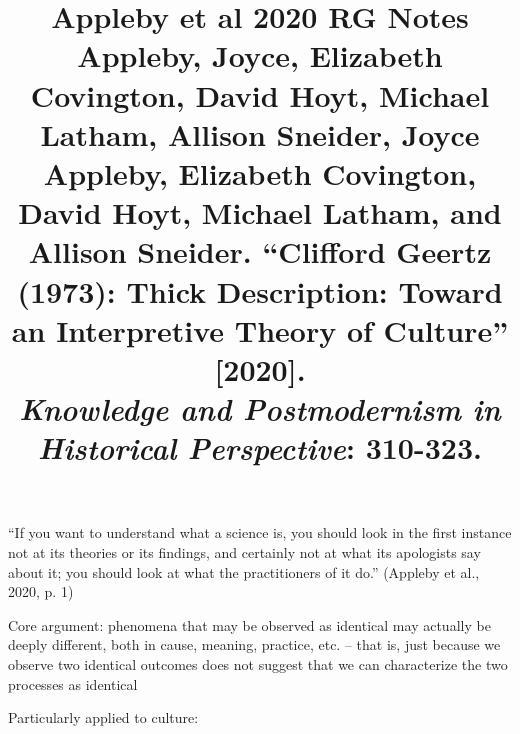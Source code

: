 \documentclass[12pt]{article}
\title{\textbf{Appleby et al 2020 RG Notes}\\
\large Appleby, Joyce, Elizabeth Covington, David Hoyt, Michael Latham, Allison Sneider, Joyce Appleby, Elizabeth Covington, David Hoyt, Michael Latham, and Allison Sneider. ``Clifford Geertz (1973): Thick Description: Toward an Interpretive Theory of Culture'' [2020].\\
\textit{Knowledge and Postmodernism in Historical Perspective}: 310-323.}
\author{}
\date{}
\begin{document}
\maketitle

``If you want to understand what a science is, you should look in the first instance not at its theories or its findings, and certainly not at what its apologists say about it; you should look at what the practitioners of it do.'' (Appleby et al., 2020, p. 1)

Core argument: phenomena that may be observed as identical may actually be deeply different, both in cause, meaning, practice, etc. -- that is, just because we observe two identical outcomes does not suggest that we can characterize the two processes as identical

Particularly applied to culture:
\end{document}
